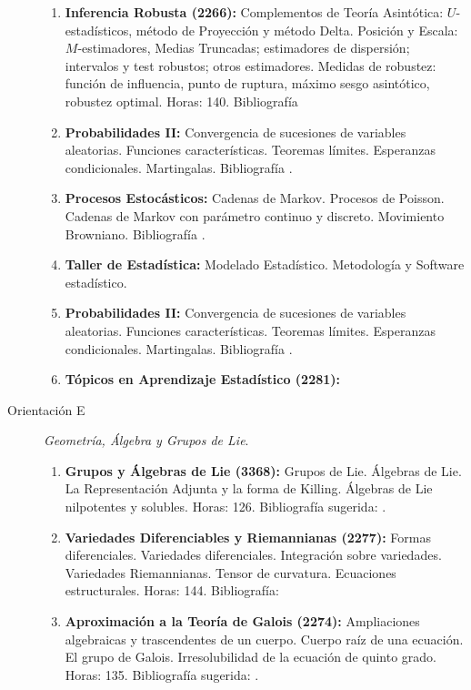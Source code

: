 \documentclass[a4paper, 12pt]{article}
\begin{document}
\begin{description}
\begin{enumerate}
\item\textbf{ Inferencia Robusta (2266):}
Complementos de Teoría Asintótica: $U$-estadísticos, método de Proyección y método Delta. Posición y Escala: $M$-estimadores, Medias Truncadas; estimadores de dispersión; intervalos y test robustos; otros estimadores.   Medidas de robustez: función de influencia, punto de ruptura, máximo sesgo asintótico, robustez optimal.  Horas: 140.
Bibliografía \cite{maronna2006robust}


\item\textbf{Probabilidades II:}  Convergencia de sucesiones de
variables aleatorias. Funciones características. Teoremas límites.
Esperanzas condicionales. Martingalas. Bibliografía \cite{ barry,
breiman,karr}.

\item\textbf{Procesos Estocásticos:} Cadenas de Markov. Procesos de Poisson.
Cadenas de Markov con parámetro continuo y discreto. Movimiento
Browniano. Bibliografía \cite{allen,cox, parzen2,karlin}.

\item\textbf{Taller de Estadística:} Modelado Estadístico. Metodología y Software
estadístico.

\item\textbf{Probabilidades II:}  Convergencia de sucesiones de
variables aleatorias. Funciones características. Teoremas límites.
Esperanzas condicionales. Martingalas. Bibliografía \cite{ barry,
breiman,karr}.

\item\textbf{Tópicos en Aprendizaje Estadístico (2281):} 


\end{enumerate}


\item[Orientación E]\emph{Geometría, Álgebra y Grupos de Lie}.

 \begin{enumerate}
\item\textbf{ Grupos y Álgebras de Lie (3368):}  Grupos de Lie. Álgebras de Lie. La Representación Adjunta y la forma de Killing. Álgebras de Lie nilpotentes y solubles.
Horas: 126. Bibliografía sugerida: \cite{boothby2003introduction, helgason2001differential}.

\item\textbf{ Variedades Diferenciables y Riemannianas  (2277):}
Formas diferenciales. Variedades diferenciales. Integración
sobre variedades. Variedades Riemannianas. Tensor de curvatura.  Ecuaciones estructurales.
 Horas: 144. Bibliografía: \cite{boothby2003introduction,do2012differential,spivak1988cálculo}

\item\textbf{ Aproximación a la Teoría de Galois (2274):} Ampliaciones algebraicas y trascendentes de un cuerpo.  Cuerpo raíz de una ecuación. El grupo de Galois. Irresolubilidad de la ecuación de quinto grado. Horas: 135. Bibliografía sugerida: \cite{herstein,artin}.
\end{enumerate}



\end{description}
\end{document}
